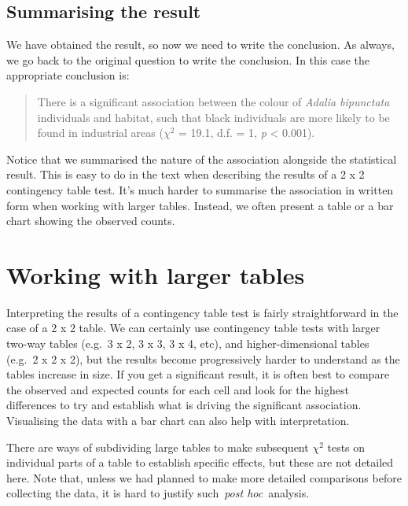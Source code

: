 \documentclass[
]{book}
\begin{document}
\hypertarget{summarising-the-result-3}{%
\subsection{Summarising the result}\label{summarising-the-result-3}}

We have obtained the result, so now we need to write the conclusion. As always, we go back to the original question to write the conclusion. In this case the appropriate conclusion is:

\begin{quote}
There is a significant association between the colour of \emph{Adalia bipunctata} individuals and habitat, such that black individuals are more likely to be found in industrial areas (\(\chi^{2}\) = 19.1, d.f. = 1, \emph{p} \textless{} 0.001).
\end{quote}

Notice that we summarised the nature of the association alongside the statistical result. This is easy to do in the text when describing the results of a 2 x 2 contingency table test. It's much harder to summarise the association in written form when working with larger tables. Instead, we often present a table or a bar chart showing the observed counts.

\hypertarget{working-with-larger-tables}{%
\section{Working with larger tables}\label{working-with-larger-tables}}

Interpreting the results of a contingency table test is fairly straightforward in the case of a 2 x 2 table. We can certainly use contingency table tests with larger two-way tables (e.g.~3 x 2, 3 x 3, 3 x 4, etc), and higher-dimensional tables (e.g.~2 x 2 x 2), but the results become progressively harder to understand as the tables increase in size. If you get a significant result, it is often best to compare the observed and expected counts for each cell and look for the highest differences to try and establish what is driving the significant association. Visualising the data with a bar chart can also help with interpretation.

There are ways of subdividing large tables to make subsequent \(\chi^{2}\) tests on individual parts of a table to establish specific effects, but these are not detailed here. Note that, unless we had planned to make more detailed comparisons before collecting the data, it is hard to justify such~\emph{post hoc}~analysis.
\end{document}
